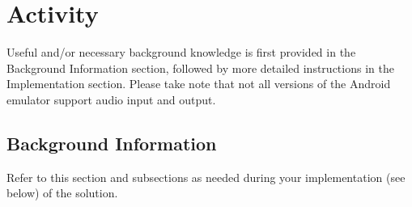 \section{Activity}
Useful and/or necessary background knowledge is first provided in the Background Information section, followed by more detailed instructions in the Implementation section.
Please take note that not all versions of the Android emulator support audio input and output.

\subsection{Background Information}
Refer to this section and subsections as needed during your implementation (see below) of the solution.


